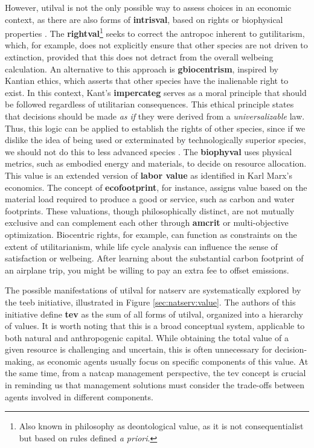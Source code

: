 \documentclass[./main_en.tex]{subfiles}
\begin{document}
\par However, \gls{utilval} is not the only possible way to assess choices in an economic context, as there are also forms of \textbf{\gls{intrisval}}, based on rights or biophysical properties \cite{kumar2012economics}. The \textbf{\gls{rightval}}\footnote{Also known in philosophy as deontological value, as it is not consequentialist but based on rules defined \textit{a priori}.} seeks to correct the \gls{antropoc} inherent to \gls{gutilitarism}, which, for example, does not explicitly ensure that other species are not driven to extinction, provided that this does not detract from the overall \gls{welbeing} calculation. An alternative to this approach is \textbf{\gls{gbiocentrism}}, inspired by Kantian ethics, which asserts that other species have the inalienable right to exist. In this context, Kant's \textbf{\gls{impercateg}} serves as a moral principle that should be followed regardless of utilitarian consequences. This ethical principle states that decisions should be made \textit{as if} they were derived from a \textit{universalizable} law. Thus, this logic can be applied to establish the rights of other species, since if we dislike the idea of being used or exterminated by technologically superior species, we should not do this to less advanced species \cite{daily1997}. The \textbf{\gls{biophyval}} uses physical metrics, such as embodied energy and materials, to decide on resource allocation. This value is an extended version of \textbf{labor value} as identified in Karl Marx's economics. The concept of \textbf{\gls{ecofootprint}}, for instance, assigns value based on the material load required to produce a good or service, such as carbon and water footprints. These valuations, though philosophically distinct, are not mutually exclusive and can complement each other through \textbf{\gls{amcrit}} or multi-objective optimization. Biocentric rights, for example, can function as constraints on the extent of utilitarianism, while life cycle analysis can influence the sense of satisfaction or \gls{welbeing}. After learning about the substantial carbon footprint of an airplane trip, you might be willing to pay an extra fee to offset emissions.

\par The possible manifestations of \gls{utilval} for \gls{natserv} are systematically explored by the \acrfull{teeb} initiative, illustrated in Figure \ref{sec:natserv:value}. The authors of this initiative define \textbf{\gls{tev}} as the sum of all forms of \gls{utilval}, organized into a hierarchy of values. It is worth noting that this is a broad conceptual \gls{system}, applicable to both natural and anthropogenic capital. While obtaining the total value of a given resource is challenging and uncertain, this is often unnecessary for decision-making, as economic agents usually focus on specific components of this value. At the same time, from a \gls{natcap} management perspective, the \gls{tev} concept is crucial in reminding us that management solutions must consider the trade-offs between agents involved in different components.
\end{document}

